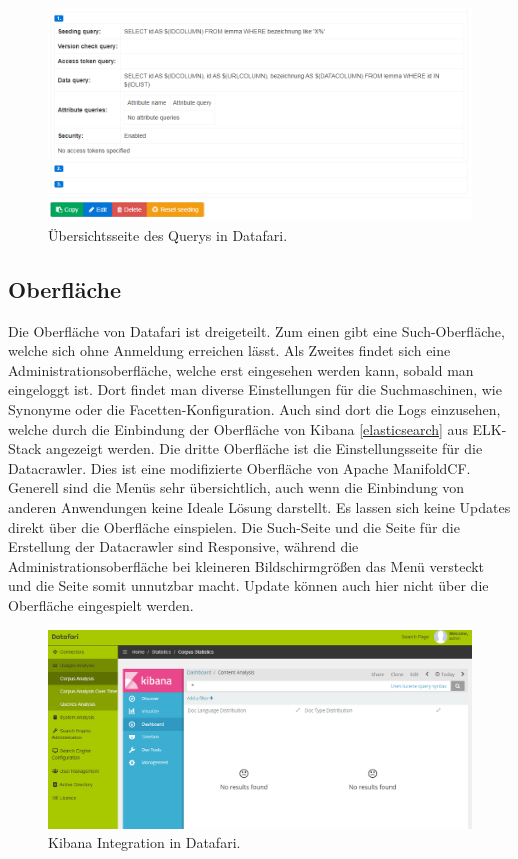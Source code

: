 \begin{figure}
	\centering
	\includegraphics[width=1\linewidth]{images/datafari_query.png}
	\caption{Übersichtsseite des Querys in Datafari.}
	\label{img:datafariQuery}
\end{figure}

\subsection{Oberfläche}

Die Oberfläche von Datafari ist dreigeteilt. Zum einen gibt eine Such-Oberfläche, welche sich ohne Anmeldung erreichen lässt. Als Zweites findet sich eine Administrationsoberfläche, welche erst eingesehen werden kann, sobald man eingeloggt ist. Dort findet man diverse Einstellungen für die Suchmaschinen, wie Synonyme oder die Facetten-Konfiguration. Auch sind dort die Logs einzusehen, welche durch die Einbindung der Oberfläche von Kibana \ref{elasticsearch} aus ELK-Stack angezeigt werden. Die dritte Oberfläche ist die Einstellungsseite für die Datacrawler. Dies ist eine modifizierte Oberfläche von Apache ManifoldCF. Generell sind die Menüs sehr übersichtlich, auch wenn die Einbindung von anderen Anwendungen keine Ideale Lösung darstellt. Es lassen sich keine Updates direkt über die Oberfläche einspielen.
Die Such-Seite und die Seite für die Erstellung der Datacrawler sind Responsive, während die Administrationsoberfläche bei kleineren Bildschirmgrößen das Menü versteckt und die Seite somit unnutzbar macht. Update können auch hier nicht über die Oberfläche eingespielt werden.

\begin{figure}
	\centering
	\includegraphics[width=1\linewidth]{images/datafari_kibana.png}
	\caption{Kibana Integration in Datafari.}
	\label{img:datafariKibana}
\end{figure}


